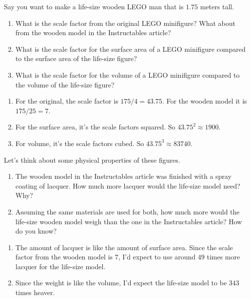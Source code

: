 \documentclass[handout,nooutcomes,noauthor,hints,12pt]{ximera}
\begin{document}
\begin{question}
 Say you want to make a life-size wooden LEGO man that is $1.75$
 meters tall.
 
\begin{enumerate}
 \item What is the scale factor from the original LEGO minifigure?
   What about from the wooden model in the Instructables article?
 \item What is the scale factor for the surface area of a LEGO
   minifigure compared to the surface area of the life-size figure?
 \item What is the scale factor for the volume of a LEGO
   minifigure compared to the volume of the life-size figure?
\end{enumerate}
\begin{freeResponse}
  \begin{enumerate}
\item For the original, the scale factor is $175/4 = 43.75$. For the wooden model it is $175/25 = 7$.
\item For the surface area, it's the scale factors squared. So $43.75^2\approx 1900$.
\item For volume, it's the scale factors cubed. So $43.75^3\approx 83740$.
  \end{enumerate}
\end{freeResponse}
\end{question}
\mynewpage

\begin{question}
  Let's think about some physical properties of these figures.
  \begin{enumerate}
 \item The wooden model in the Instructables article was finished with
   a spray coating of lacquer.  How much more lacquer would the life-size model need? Why?
 \item Assuming the same materials are used for both, how much more
   would the life-size wooden model weigh than the one in the
   Instructables article?  How do you know?
\end{enumerate}
  \begin{freeResponse}
    \begin{enumerate}
  \item The amount of lacquer is like the amount of surface
    area. Since the scale factor from the wooden model is $7$, I'd
    expect to use around $49$ times more lacquer for the life-size
    model.
  \item Since the weight is like the volume, I'd expect the life-size model to be $343$ times heaver.
    \end{enumerate}
    \end{freeResponse}
\end{question}
\end{document}
